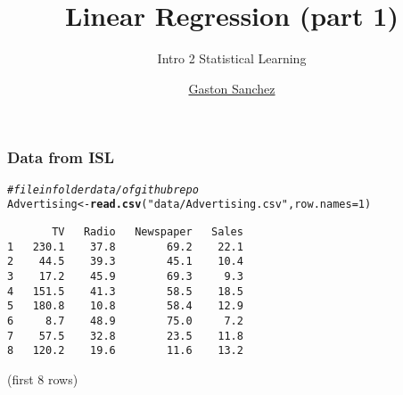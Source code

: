 \documentclass[12pt]{beamer}\usepackage[]{graphicx}\usepackage[]{color}
\title{Linear Regression (part 1)}
\subtitle{Intro 2 Statistical Learning}
\author{\href{http://www.gastonsanchez.com}{Gaston Sanchez}}
\institute{\href{https://creativecommons.org/licenses/by-sa/4.0/}{\tt \scriptsize \color{foreground} CC BY-SA 4.0}}
\date{}
\makeatletter
\newcommand{\hlnum}[1]{\textcolor[rgb]{0.686,0.059,0.569}{#1}}%
\newcommand{\hlstr}[1]{\textcolor[rgb]{0.192,0.494,0.8}{#1}}%
\newcommand{\hlcom}[1]{\textcolor[rgb]{0.678,0.584,0.686}{\textit{#1}}}%
\newcommand{\hlstd}[1]{\textcolor[rgb]{0.345,0.345,0.345}{#1}}%
\newcommand{\hlkwb}[1]{\textcolor[rgb]{0.69,0.353,0.396}{#1}}%
\newcommand{\hlkwc}[1]{\textcolor[rgb]{0.333,0.667,0.333}{#1}}%
\newcommand{\hlkwd}[1]{\textcolor[rgb]{0.737,0.353,0.396}{\textbf{#1}}}%
\newenvironment{kframe}{%
 \def\at@end@of@kframe{}%
 \ifinner\ifhmode%
  \def\at@end@of@kframe{\end{minipage}}%
  \begin{minipage}{\columnwidth}%
 \fi\fi%
 \def\FrameCommand##1{\hskip\@totalleftmargin \hskip-\fboxsep
 \colorbox{shadecolor}{##1}\hskip-\fboxsep
     \hskip-\linewidth \hskip-\@totalleftmargin \hskip\columnwidth}%
 \MakeFramed {\advance\hsize-\width
   \@totalleftmargin\z@ \linewidth\hsize
   \@setminipage}}%
 {\par\unskip\endMakeFramed%
 \at@end@of@kframe}
\newenvironment{knitrout}{}{} %
\makeatother
\begin{document}
{
  \frame{\titlepage} 
}


\begin{frame}
\begin{center}
\Huge{}
\end{center}
\end{frame}


\begin{frame}[fragile]
\frametitle{ Data from ISL}

\begin{knitrout}\scriptsize
{}\color{fgcolor}\begin{kframe}
\begin{alltt}
\hlcom{# file in folder data/ of github repo}
\hlstd{Advertising} \hlkwb{<-} \hlkwd{read.csv}\hlstd{(}\hlstr{"data/Advertising.csv"}\hlstd{,} \hlkwc{row.names} \hlstd{=} \hlnum{1}\hlstd{)}
\end{alltt}
\end{kframe}
\end{knitrout}

\begin{knitrout}\footnotesize
{}\color{fgcolor}\begin{kframe}
\begin{verbatim}
       TV   Radio   Newspaper   Sales
1   230.1    37.8        69.2    22.1
2    44.5    39.3        45.1    10.4
3    17.2    45.9        69.3     9.3
4   151.5    41.3        58.5    18.5
5   180.8    10.8        58.4    12.9
6     8.7    48.9        75.0     7.2
7    57.5    32.8        23.5    11.8
8   120.2    19.6        11.6    13.2
\end{verbatim}
\end{kframe}
\end{knitrout}

{\lolit (first 8 rows)}

\end{frame}

\end{document}
